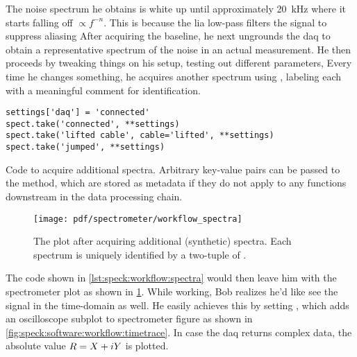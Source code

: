 The noise spectrum he obtains is white up until approximately \qty{20}{\kilo\hertz} where it starts falling off $\propto f^{-n}$.
This is because the \gls{lia} low-pass filters the signal to suppress aliasing
After acquiring the baseline, he next ungrounds the \gls{daq} to obtain a representative spectrum of the noise in an actual measurement.
He then proceeds by tweaking things on his setup, testing out different parameters, \etc
Every time he changes something, he acquires another spectrum using , labeling each with a meaningful comment for identification.
\begin{listing}[htpb]
    \begin{verbatim}
settings['daq'] = 'connected'
spect.take('connected', **settings)
spect.take('lifted cable', cable='lifted', **settings)
spect.take('jumped', **settings)
    \end{verbatim}
    \caption[]{
        Code to acquire additional spectra.
        Arbitrary key-value pairs can be passed to the  method, which are stored as metadata if they do not apply to any functions downstream in the data processing chain.
    }
    \label{lst:speck:workflow:spectra}
\end{listing}
\begin{figure}
    \centering
    \texttt{[image: pdf/spectrometer/workflow\_spectra]}
    \caption{
        The \pyspeck plot after acquiring additional (synthetic) spectra.
        Each spectrum is uniquely identified by a two-tuple of .
    }
    \label{fig:speck:software:workflow:spectra}
\end{figure}
The code shown in \cref{lst:speck:workflow:spectra} would then leave him with the spectrometer plot as shown in \cref{fig:speck:software:workflow:spectra}.
While working, Bob realizes he'd like see the signal in the time-domain as well.
He easily achieves this by setting , which adds an oscilloscope subplot to spectrometer figure as shown in \cref{fig:speck:software:workflow:timetrace}.
In case the \gls{daq} returns complex data, the absolute value $R = X + i Y$ is plotted.

